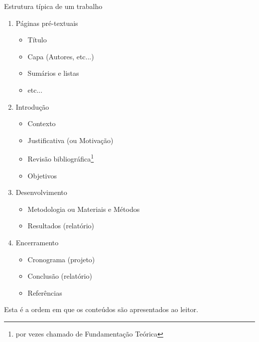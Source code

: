 \documentclass{beamer}
\begin{document}
\begin{frame}{Estrutura típica de um trabalho}
  \begin{enumerate}
    \footnotesize
  \item Páginas pré-textuais
    \begin{itemize}
      \scriptsize
    \item<2,6> Título 
    \item<2> Capa (Autores, etc...)
    \item<2> Sumários e listas
    \item<2> etc...
    \end{itemize}
  \item Introdução 
    \begin{itemize}
      \scriptsize
    \item<3> Contexto
    \item<3> Justificativa (ou Motivação)
    \item<3> Revisão bibliográfica\footnote{\tiny por vezes chamado
        de Fundamentação Teórica}
    \item<3,6> Objetivos 
    \end{itemize}
  \item Desenvolvimento
    \begin{itemize}
      \scriptsize
    \item<4,6> Metodologia ou Materiais e Métodos 
    \item<4> Resultados (relatório)
    \end{itemize}
  \item Encerramento
    \begin{itemize}
      \scriptsize
    \item<5,6> Cronograma (projeto) 
    \item<5> Conclusão (relatório)
    \item<5> Referências
    \end{itemize}
  \end{enumerate}

  \vfill
  \scriptsize
  Esta é a ordem em que os conteúdos são apresentados ao leitor.
\end{frame}
\end{document}
